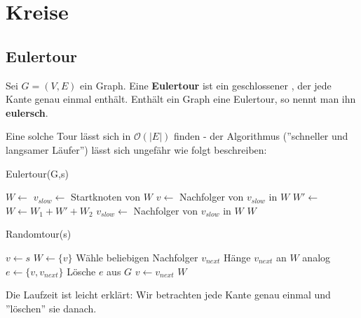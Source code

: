 \chapter{Kreise}
\section{Eulertour}
\begin{definition}
    Sei $G = (V,E)$ ein Graph. Eine \textbf{Eulertour} ist ein geschlossener , der jede Kante genau
    einmal enthält. Enthält ein Graph eine Eulertour, so nennt man ihn \textbf{eulersch}.
\end{definition}
\bigskip

Eine solche Tour lässt sich in $\mathcal{O}(|E|)$ finden - der Algorithmus (''schneller und langsamer Läufer'')
lässt sich ungefähr wie folgt beschreiben:

\begin{algorithm}
    \caption{Eulertour(G,s)}
    \begin{algorithmic}[1]
        \State $W \leftarrow$  
        \State $v_{slow} \leftarrow $ Startknoten von $W$ 
            \State $v \leftarrow$ Nachfolger von $v_{slow}$ in $W$
             
                \State $W' \leftarrow$ 
                \State $W \leftarrow W_1 + W' + W_2$
            \EndIf
            \State $v_{slow} \leftarrow $ Nachfolger von $v_{slow}$ in $W$
        \EndWhile
        \Return $W$
    \end{algorithmic}
\end{algorithm}

\begin{algorithm}
    \caption{Randomtour(s)}
    \begin{algorithmic}[1]
        \State $v \leftarrow s$
        \State $W \leftarrow \{v\}$
         
            \State Wähle beliebigen Nachfolger $v_{next}$
            \State Hänge $v_{next}$ an $W$ analog
            \State $e \leftarrow \{v, v_{next}\}$
            \State Lösche $e$ aus $G$
            \State $v \leftarrow v_{next}$
        \EndWhile
        \State \Return $W$
    \end{algorithmic}
\end{algorithm}

Die Laufzeit ist leicht erklärt: Wir betrachten jede Kante genau einmal und ''löschen'' sie danach.

